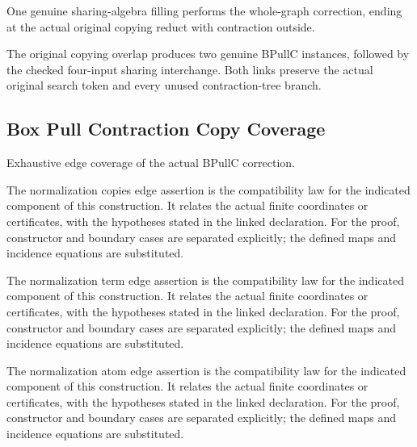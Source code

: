 One genuine sharing-algebra filling performs the whole-graph correction, ending at the actual original copying reduct with contraction outside.
\par{}

The original copying overlap produces two genuine BPullC instances, followed by the checked four-input sharing interchange. Both links preserve the actual original search token and every unused contraction-tree branch.
\par{}

\subsection{Box Pull Contraction Copy Coverage}
Exhaustive edge coverage of the actual BPullC correction.

The normalization copies edge assertion is the compatibility law for the indicated component of this construction. It relates the actual finite coordinates or certificates, with the hypotheses stated in the linked declaration.
For the proof, constructor and boundary cases are separated explicitly; the defined maps and incidence equations are substituted.
\par{}

The normalization term edge assertion is the compatibility law for the indicated component of this construction. It relates the actual finite coordinates or certificates, with the hypotheses stated in the linked declaration.
For the proof, constructor and boundary cases are separated explicitly; the defined maps and incidence equations are substituted.
\par{}

The normalization atom edge assertion is the compatibility law for the indicated component of this construction. It relates the actual finite coordinates or certificates, with the hypotheses stated in the linked declaration.
For the proof, constructor and boundary cases are separated explicitly; the defined maps and incidence equations are substituted.
\par{}

